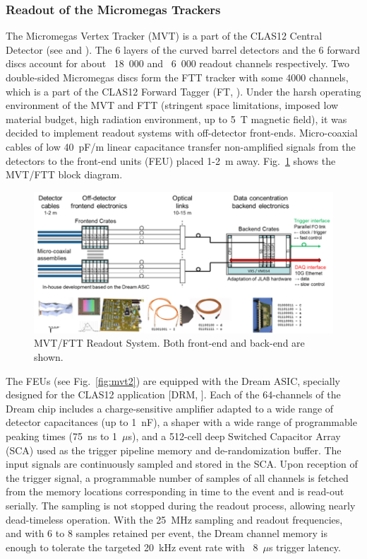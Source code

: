 \subsubsection{Readout of the Micromegas Trackers}

The Micromegas Vertex Tracker (MVT) is a part of the CLAS12 Central Detector (see \cite{mvt-ref} and \cite{ftt-ref}). The 6 layers of the curved barrel detectors and the 6 forward discs account for about ~18 000 and ~6 000 readout channels respectively. Two double-sided Micromegas discs form the FTT tracker with some 4000 channels, which is a part of the CLAS12 Forward Tagger (FT, \cite{ft-ref}). Under the harsh operating environment of the MVT and FTT (stringent space limitations, imposed low material budget, high radiation environment, up to 5~T magnetic field), it was decided to implement readout systems with off-detector front-ends. Micro-coaxial cables of low 40~pF/m linear capacitance transfer non-amplified signals from the detectors to the front-end units (FEU) placed 1-2~m away. Fig.~\ref{fig:mvt1} shows the MVT/FTT block diagram.

\begin{figure}[hbt]
	\centering
	\includegraphics[width=1.0\columnwidth,keepaspectratio]{img/mvt1.png}
	\caption{MVT/FTT Readout System. Both front-end and back-end are shown.}
	\label{fig:mvt1}
\end{figure}

The FEUs (see Fig.~\ref{fig:mvt2}) are equipped with the Dream ASIC, specially designed for the CLAS12 application [DRM, \cite{dream-ref}]. Each of the 64-channels of the Dream chip includes a charge-sensitive amplifier adapted to a wide range of detector capacitances (up to 1~nF), a shaper with a wide range of programmable peaking times (75~ns to 1~$\mu$s), and a 512-cell deep Switched Capacitor Array (SCA) used as the trigger pipeline memory and de-randomization buffer. The input signals are continuously sampled and stored in the SCA. Upon reception of the trigger signal, a programmable number of samples of all channels is fetched from the memory locations corresponding in time to the event and is read-out serially. The sampling is not stopped during the readout process, allowing nearly dead-timeless operation. With the 25~MHz sampling and readout frequencies, and with 6 to 8 samples retained per event, the Dream channel memory is enough to tolerate the targeted 20~kHz event rate with ~8~$\mu$s trigger latency.

